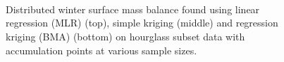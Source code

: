 \documentclass[12pt]{article}
\begin{document}
\begin{figure}[H]
	\centering
	\\
	\\
	\\
	\caption{Distributed winter surface mass balance found using linear regression (MLR) (top), simple kriging (middle) and regression kriging (BMA) (bottom) on hourglass subset data with accumulation points at various sample sizes. }
	\label{fig:SubsetMeanSWE_samplesizeNdensity_Ahourglass}
\end{figure}
\end{document}
